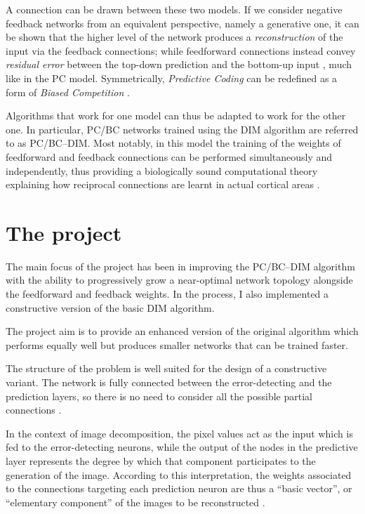 \documentclass[11pt,a4paper]{report}
\newcommand{\quot}[1]{``#1''}
\begin{document}
		A connection can be drawn between these two models. If we consider negative feedback networks from an equivalent perspective, namely a generative one, it can be shown that the higher level of the network produces a \emph{reconstruction} of the input via the feedback connections; while feedforward connections instead convey \emph{residual error} between the top-down prediction and the bottom-up input \cite{spratling2009unsupervised}, much like in the PC model.
		Symmetrically, \emph{Predictive Coding} can be redefined as a form of \emph{Biased Competition} \cite{spratling2008predictive}.
		
		Algorithms that work for one model can thus be adapted to work for the other one. In particular, PC/BC networks trained using the DIM algorithm are referred to as PC/BC--DIM. Most notably, in this model the training of the weights of feedforward and feedback connections can be performed simultaneously and independently, thus providing a biologically sound computational theory explaining how reciprocal connections are learnt in actual cortical areas \cite{callaway1998local,spratling2012unsupervised}.
		
		\section{The project}
		The main focus of the project has been in improving the PC/BC--DIM algorithm with the ability to progressively grow a near-optimal network topology alongside the feedforward and feedback weights. In the process, I also implemented a constructive version of the basic DIM algorithm.
		
		The project aim is to provide an enhanced version of the original algorithm which performs equally well but produces smaller networks that can be trained faster.
		
		The structure of the problem is well suited for the design of a constructive variant. The network is fully connected between the error-detecting and the prediction layers, so there is no need to consider all the possible partial connections \cite{?}.
		
		In the context of image decomposition, the pixel values act as the input which is fed to the error-detecting neurons, while the output of the nodes in the predictive layer represents the degree by which that component participates to the generation of the image. According to this interpretation, the weights associated to the connections targeting each prediction neuron are thus a \quot{basic vector}, or \quot{elementary component} of the images to be reconstructed \cite{spratling2014predictive}.
\end{document}
